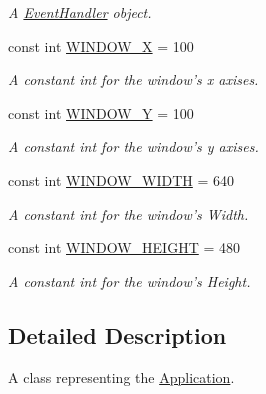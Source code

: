 \begin{DoxyCompactItemize}
\begin{DoxyCompactList}\small\item\em A \hyperlink{class_event_handler}{Event\+Handler} object. \end{DoxyCompactList}\item 
\hypertarget{class_application_aad86b8086daa8c8d85e803aa7f3b70da}{const int \hyperlink{class_application_aad86b8086daa8c8d85e803aa7f3b70da}{W\+I\+N\+D\+O\+W\+\_\+\+X} = 100}\label{class_application_aad86b8086daa8c8d85e803aa7f3b70da}

\begin{DoxyCompactList}\small\item\em A constant int for the window's x axises. \end{DoxyCompactList}\item 
\hypertarget{class_application_a44acc475d3da03e92d09629cc88bfffb}{const int \hyperlink{class_application_a44acc475d3da03e92d09629cc88bfffb}{W\+I\+N\+D\+O\+W\+\_\+\+Y} = 100}\label{class_application_a44acc475d3da03e92d09629cc88bfffb}

\begin{DoxyCompactList}\small\item\em A constant int for the window's y axises. \end{DoxyCompactList}\item 
\hypertarget{class_application_a58027269bdd05739a498f4e35d36380c}{const int \hyperlink{class_application_a58027269bdd05739a498f4e35d36380c}{W\+I\+N\+D\+O\+W\+\_\+\+W\+I\+D\+T\+H} = 640}\label{class_application_a58027269bdd05739a498f4e35d36380c}

\begin{DoxyCompactList}\small\item\em A constant int for the window's Width. \end{DoxyCompactList}\item 
\hypertarget{class_application_a0bfec21f44d9cd3972fadf5ab5485e3b}{const int \hyperlink{class_application_a0bfec21f44d9cd3972fadf5ab5485e3b}{W\+I\+N\+D\+O\+W\+\_\+\+H\+E\+I\+G\+H\+T} = 480}\label{class_application_a0bfec21f44d9cd3972fadf5ab5485e3b}

\begin{DoxyCompactList}\small\item\em A constant int for the window's Height. \end{DoxyCompactList}\end{DoxyCompactItemize}


\subsection{Detailed Description}
A class representing the \hyperlink{class_application}{Application}. 


